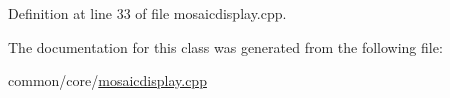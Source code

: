 Definition at line 33 of file mosaicdisplay.\+cpp.


\begin{DoxyCode}{0}
\end{DoxyCode}


The documentation for this class was generated from the following file\+:\begin{DoxyCompactItemize}
\item 
common/core/\mbox{\hyperlink{mosaicdisplay_8cpp}{mosaicdisplay.\+cpp}}\end{DoxyCompactItemize}
